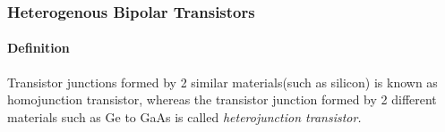 \begin{frame}
  \frametitle{Heterogenous Bipolar Transistors}
  \framesubtitle{Definition}
  Transistor junctions formed by 2 similar materials(such as silicon) is known as homojunction transistor, whereas the transistor junction formed by 2 different materials such as Ge to GaAs is called \emph{heterojunction transistor.}
\end{frame}
